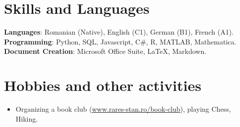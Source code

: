 \documentclass[a4paper, 11pt]{article}
\begin{document}
\section{Skills and Languages}
 \begin{itemize}[leftmargin=0.5cm, label={}]
    {\item{
     \textbf{Languages}{: Romanian (Native), English (C1), German (B1), French (A1).} \\
     \textbf{Programming}{: Python, SQL, Javascript, C\#, R, MATLAB, Mathematica.} \\
     \textbf{Document Creation}{: Microsoft Office Suite, LaTeX, Markdown.} \\
    }}
 \end{itemize}
 

\section{Hobbies and other activities}
\begin{itemize}[leftmargin=0.5cm, label={}]
\item{
Organizing a book club (\href{https://www.rares-stan.ro/book-club}{www.rares-stan.ro/book-club}), playing Chess, Hiking.}
\end{itemize}
 
    
\end{document}
